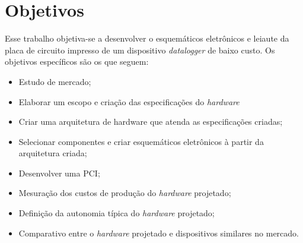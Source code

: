 



\section{Objetivos}

Esse trabalho objetiva-se a desenvolver o esquemáticos eletrônicos e leiaute da placa de circuito impresso de um dispositivo \textit{datalogger} de baixo custo. Os objetivos específicos são os que seguem:

\begin{itemize}
    \item Estudo de mercado;
    \item Elaborar um escopo e criação das especificações do \textit{hardware}
    \item Criar uma arquitetura de hardware que atenda as especificações criadas;
    \item Selecionar componentes e criar esquemáticos eletrônicos à partir da arquitetura criada;
    \item Desenvolver uma \gls{PCI};
    \item Mesuração dos custos de produção do \textit{hardware} projetado;
    \item Definição da autonomia típica do \textit{hardware} projetado;
    \item Comparativo entre o \textit{hardware} projetado e dispositivos similares no mercado.
    
\end{itemize}


